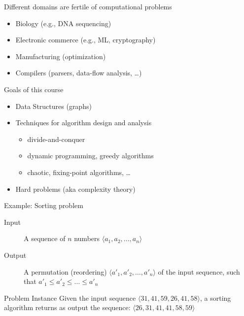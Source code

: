\documentclass{beamer}
\begin{document}
\begin{frame}{Different domains are fertile of computational problems}

  \begin{itemize}
   \item Biology (e.g., DNA sequencing)
   \item Electronic commerce (e.g., ML, cryptography)
   \item Manufacturing (optimization)
   \item Compilers (parsers, data-flow analysis, \ldots)
  \end{itemize}
  
\end{frame}

\begin{frame}{Goals of this course}
  \begin{itemize}
   \item Data Structures (graphs)
   \item Techniques for {\color{blue}algorithm design and analysis}
     \begin{itemize}
       \item divide-and-conquer
       \item dynamic programming, greedy algorithms
       \item chaotic, fixing-point algorithms, \ldots  
     \end{itemize}
   \item Hard problems (aka {\color{blue}complexity} theory) 
  \end{itemize}
\end{frame}


\begin{frame}{Example: Sorting problem}

  \begin{description}
   \item[Input] A sequence of $n$ numbers $\langle a_1, a_2, \ldots, a_n \rangle$
   \item[Output] A permutation (reordering) $\langle a'_1, a'_2, \ldots, a'_n \rangle$ of the input
     sequence, such that $a'_1 \leq a'_2 \leq \ldots \leq a'_n$
  \end{description}

  \pause
  
  \begin{block}{Problem Instance}
    Given the input sequence $\langle 31, 41, 59, 26, 41, 58\rangle$,
    a sorting algorithm returns as output the sequence: \pause
    $\langle 26, 31, 41, 41, 58, 59 \rangle$
  \end{block}


\end{frame}
\end{document}
